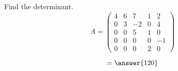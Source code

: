 \documentclass{ximera}
\author{Parisa Fatheddin}
\begin{document}
\begin{exercise}

Find the determinant.
\[
A= \begin{pmatrix}
4 & 6 & 7 & 1 & 2\\
0 & 3 & -2 & 0 & 4\\
0 & 0 & 5 & 1 & 0\\
0 & 0 & 0 & 0 & -1\\
0 & 0 & 0 & 2 & 0
\end{pmatrix}
\]

\begin{prompt}
\[= \answer{120}
\]
\end{prompt}














\end{exercise}
\end{document}
